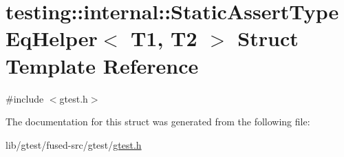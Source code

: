 \hypertarget{structtesting_1_1internal_1_1_static_assert_type_eq_helper}{\section{testing\-:\-:internal\-:\-:Static\-Assert\-Type\-Eq\-Helper$<$ T1, T2 $>$ Struct Template Reference}
\label{structtesting_1_1internal_1_1_static_assert_type_eq_helper}
}


{\ttfamily \#include $<$gtest.\-h$>$}



The documentation for this struct was generated from the following file\-:\begin{DoxyCompactItemize}
\item 
lib/gtest/fused-\/src/gtest/\hyperlink{fused-src_2gtest_2gtest_8h}{gtest.\-h}\end{DoxyCompactItemize}

